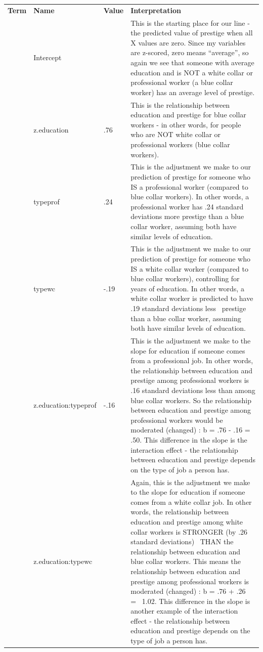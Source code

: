 \documentclass[
  letterpaper,
  DIV=11,
  numbers=noendperiod,
  oneside]{scrreprt}
\begin{document}
\begin{longtable}[]{@{}
  >{\raggedright\arraybackslash}p{}
  >{\raggedright\arraybackslash}p{}
  >{\raggedright\arraybackslash}p{}
  >{\raggedright\arraybackslash}p{}@{}}
\toprule\noalign{}
\endhead
\bottomrule\noalign{}
\endlastfoot
\textbf{Term} & \textbf{Name} & \textbf{Value} &
\textbf{Interpretation} \\
1 & Intercept & 0.00 & This is the starting place for our line - the
predicted value of prestige when all X values are zero. Since my
variables are z-scored, zero means ``average'', so again we see that
someone with average education and is NOT a white collar or professional
worker (a blue collar worker) has an average level of prestige. \\
2 & z.education & .76 & This is the relationship between education and
prestige for blue collar workers - in other words, for people who are
NOT white collar or professional workers (blue collar workers). \\
3 & typeprof & .24 & This is the adjustment we make to our prediction of
prestige for someone who IS a professional worker (compared to blue
collar workers). In other words, a professional worker has .24 standard
deviations more prestige than a blue collar worker, assuming both have
similar levels of education. \\
4 & typewc & -.19 & This is the adjustment we make to our prediction of
prestige for someone who IS a white collar worker (compared to blue
collar workers), controlling for years of education. In other words, a
white collar worker is predicted to have .19 standard deviations less~
prestige than a blue collar worker, assuming both have similar levels of
education.~ \\
5 & z.education:typeprof & -.16 & This is the adjustment we make to the
slope for education if someone comes from a professional job. In other
words, the relationship between education and prestige among
professional workers is .16 standard deviations less than among blue
collar workers. So the relationship between education and prestige among
professional workers would be moderated (changed) : b = .76 - .16 =~
.50. This difference in the slope is the interaction effect - the
relationship between education and prestige depends on the type of job a
person has. \\
6 & z.education:typewc & 1.02 & Again, this is the adjustment we make to
the slope for education if someone comes from a white collar job. In
other words, the relationship between education and prestige among white
collar workers is STRONGER (by .26 standard deviations)~ THAN the
relationship between education and blue collar workers. This means the
relationship between education and prestige among professional workers
is moderated (changed) : b = .76 + .26 =~ 1.02. This difference in the
slope is another example of the interaction effect - the relationship
between education and prestige depends on the type of job a person
has. \\
\end{longtable}
\end{document}
